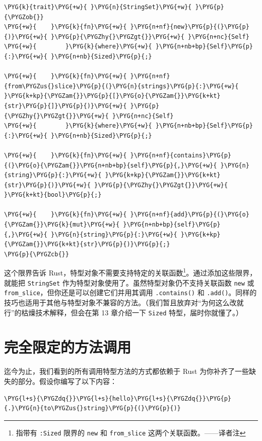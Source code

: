 \begin{Verbatim}[commandchars=\\\{\},breaklines=true,breakanywhere=true,fontsize=\codefont,xleftmargin=17bp]
\PYG{k}{trait}\PYG{+w}{ }\PYG{n}{StringSet}\PYG{+w}{ }\PYG{p}{\PYGZob{}}
\PYG{+w}{    }\PYG{k}{fn}\PYG{+w}{ }\PYG{n+nf}{new}\PYG{p}{(}\PYG{p}{)}\PYG{+w}{ }\PYG{p}{\PYGZhy{}\PYGZgt{}}\PYG{+w}{ }\PYG{n+nc}{Self}
\PYG{+w}{        }\PYG{k}{where}\PYG{+w}{ }\PYG{n+nb+bp}{Self}\PYG{p}{:}\PYG{+w}{ }\PYG{n+nb}{Sized}\PYG{p}{;}

\PYG{+w}{    }\PYG{k}{fn}\PYG{+w}{ }\PYG{n+nf}{from\PYGZus{}slice}\PYG{p}{(}\PYG{n}{strings}\PYG{p}{:}\PYG{+w}{ }\PYG{k+kp}{\PYGZam{}}\PYG{p}{[}\PYG{o}{\PYGZam{}}\PYG{k+kt}{str}\PYG{p}{]}\PYG{p}{)}\PYG{+w}{ }\PYG{p}{\PYGZhy{}\PYGZgt{}}\PYG{+w}{ }\PYG{n+nc}{Self}
\PYG{+w}{        }\PYG{k}{where}\PYG{+w}{ }\PYG{n+nb+bp}{Self}\PYG{p}{:}\PYG{+w}{ }\PYG{n+nb}{Sized}\PYG{p}{;}

\PYG{+w}{    }\PYG{k}{fn}\PYG{+w}{ }\PYG{n+nf}{contains}\PYG{p}{(}\PYG{o}{\PYGZam{}}\PYG{n+nb+bp}{self}\PYG{p}{,}\PYG{+w}{ }\PYG{n}{string}\PYG{p}{:}\PYG{+w}{ }\PYG{k+kp}{\PYGZam{}}\PYG{k+kt}{str}\PYG{p}{)}\PYG{+w}{ }\PYG{p}{\PYGZhy{}\PYGZgt{}}\PYG{+w}{ }\PYG{k+kt}{bool}\PYG{p}{;}

\PYG{+w}{    }\PYG{k}{fn}\PYG{+w}{ }\PYG{n+nf}{add}\PYG{p}{(}\PYG{o}{\PYGZam{}}\PYG{k}{mut}\PYG{+w}{ }\PYG{n+nb+bp}{self}\PYG{p}{,}\PYG{+w}{ }\PYG{n}{string}\PYG{p}{:}\PYG{+w}{ }\PYG{k+kp}{\PYGZam{}}\PYG{k+kt}{str}\PYG{p}{)}\PYG{p}{;}
\PYG{p}{\PYGZcb{}}
\end{Verbatim}

这个限界告诉 Rust，特型对象不需要支持特定的关联函数\footnote{指带有 \texttt{:Sized} 限界的 \texttt{new} 和 \texttt{from\_slice} 这两个关联函数。——译者注}。通过添加这些限界，就能把 \texttt{StringSet} 作为特型对象使用了。虽然特型对象仍不支持关联函数 \texttt{new} 或 \texttt{from\_slice}，但你还是可以创建它们并用其调用 \texttt{.contains()} 和 \texttt{.add()}。同样的技巧也适用于其他与特型对象不兼容的方法。（我们暂且放弃对“为何这么改就行”的枯燥技术解释，但会在第 13 章介绍一下 \texttt{Sized} 特型，届时你就懂了。）

\section{完全限定的方法调用}

迄今为止，我们看到的所有调用特型方法的方式都依赖于 Rust 为你补齐了一些缺失的部分。假设你编写了以下内容：

\begin{Verbatim}[commandchars=\\\{\},breaklines=true,breakanywhere=true,fontsize=\codefont,xleftmargin=17bp]
\PYG{l+s}{\PYGZdq{}}\PYG{l+s}{hello}\PYG{l+s}{\PYGZdq{}}\PYG{p}{.}\PYG{n}{to\PYGZus{}string}\PYG{p}{(}\PYG{p}{)}
\end{Verbatim}

